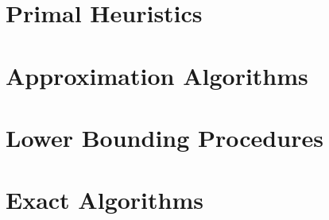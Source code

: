\section{Primal Heuristics}\label{sec:solving:primal}
\section{Approximation Algorithms}\label{sec:solving:approx}

\section{Lower Bounding Procedures}
\label{sec:solving:lower}

\section{Exact Algorithms}\label{sec:solving:exact}
